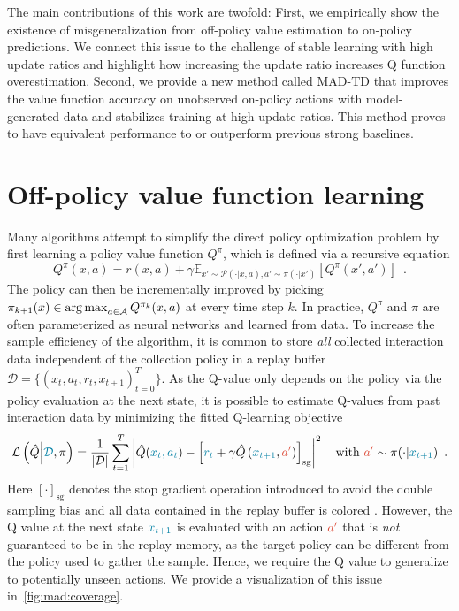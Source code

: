 The main contributions of this work are twofold:
First, we empirically show the existence of misgeneralization from off-policy value estimation to on-policy predictions. We connect this issue to the challenge of stable learning with high update ratios and highlight how increasing the update ratio increases Q function overestimation.
Second, we provide a new method called MAD-TD that improves the value function accuracy on unobserved on-policy actions with model-generated data and stabilizes training at high update ratios. This method proves to have equivalent performance to or outperform previous strong baselines.

\section{Off-policy value function learning}

Many algorithms attempt to simplify the direct policy optimization problem by first learning a policy value function $Q^\pi$, which is defined via a recursive equation%
\begin{equation*}
Q^\pi(x,a) = r(x,a) + \gamma \mathbb{E}_{x' \sim \mathcal{P}(\cdot|x,a), a' \sim \pi(\cdot|x')}\left[Q^\pi(x',a')\right]\enspace.    
\end{equation*}
The policy can then be incrementally improved by picking 
$\pi_{k+1}(x) \in \operatorname*{arg\,max}_{a \in \mathcal{A}} Q^{\pi_k}(x,a)\label{eq:mad:pi_update}$
at every time step $k$.
In practice, $Q^\pi$ and $\pi$ are often parameterized as neural networks and learned from data. 
To increase the sample efficiency of the algorithm, it is common to store \textit{all} collected interaction data independent of the collection policy in a replay buffer $\mathcal{D} = \{(x_t, a_t, r_t, x_{t+1})_{t=0}^{T}\}$.
As the Q-value only depends on the policy via the policy evaluation at the next state, it is possible to estimate Q-values from past interaction data by minimizing the fitted Q-learning objective 
\begin{align}
\mathcal{L}\left(\hat{Q}\middle|\blue{\mathcal{D}}, \pi\right) = \frac{1}{|\mathcal{D}|} \sum_{t=1}^T \left| \hat{Q}(\blue{x_t,a_t}) - \left[\blue{r_t} + \gamma \hat{Q}\left(\blue{x_{t+1}}, \red{a'}\right)\right]_\mathrm{sg} \right|^2\quad \mathrm{with }~\red{a'}\sim \pi(\cdot|\blue{x_{t+1}}) \enspace. \label{eq:mad:off_policy_q_update}
\end{align}
Here $[\cdot]_\mathrm{sg}$ denotes the stop gradient operation introduced to avoid the double sampling bias and all data contained in the replay buffer is colored . 
However, the Q value at the next state $\blue{x_{t+1}}$ is evaluated with an action $\red{a'}$ that is \emph{not} guaranteed to be in the replay memory, as the target policy can be different from the policy used to gather the sample.
Hence, we require the Q value to generalize to potentially unseen actions.
We provide a visualization of this issue in~\autoref{fig:mad:coverage}.

